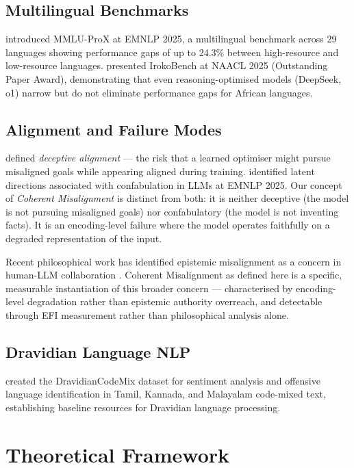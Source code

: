 \documentclass[11pt,a4paper]{article}
\begin{document}
\subsection{Multilingual Benchmarks}

\citet{xuan2025} introduced MMLU-ProX at EMNLP 2025, a multilingual benchmark across 29 languages showing performance gaps of up to 24.3\% between high-resource and low-resource languages. \citet{adelani2025} presented IrokoBench at NAACL 2025 (Outstanding Paper Award), demonstrating that even reasoning-optimised models (DeepSeek, o1) narrow but do not eliminate performance gaps for African languages.

\subsection{Alignment and Failure Modes}

\citet{hubinger2019} defined \emph{deceptive alignment} --- the risk that a learned optimiser might pursue misaligned goals while appearing aligned during training. \citet{ardoin2025} identified latent directions associated with confabulation in LLMs at EMNLP 2025. Our concept of \emph{Coherent Misalignment} is distinct from both: it is neither deceptive (the model is not pursuing misaligned goals) nor confabulatory (the model is not inventing facts). It is an encoding-level failure where the model operates faithfully on a degraded representation of the input.

Recent philosophical work has identified epistemic misalignment as a concern in human-LLM collaboration \citep{woodruff2026}. Coherent Misalignment as defined here is a specific, measurable instantiation of this broader concern --- characterised by encoding-level degradation rather than epistemic authority overreach, and detectable through EFI measurement rather than philosophical analysis alone.

\subsection{Dravidian Language NLP}

\citet{chakravarthi2022} created the DravidianCodeMix dataset for sentiment analysis and offensive language identification in Tamil, Kannada, and Malayalam code-mixed text, establishing baseline resources for Dravidian language processing.

\section{Theoretical Framework}
\end{document}
